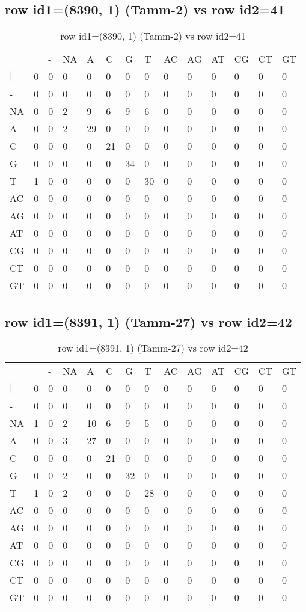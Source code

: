 \subsection{row id1=(8390, 1) (Tamm-2) vs row id2=41}
\begin{center}
\begin{longtable}{|l|l|l|l|l|l|l|l|l|l|l|l|l|l|}
\caption{row id1=(8390, 1) (Tamm-2) vs row id2=41} \label{table_dm642}\\
\hline
\\
\hline
&$|$&-&NA&A&C&G&T&AC&AG&AT&CG&CT&GT\\
$|$&0&0&0&0&0&0&0&0&0&0&0&0&0\\
-&0&0&0&0&0&0&0&0&0&0&0&0&0\\
NA&0&0&2&9&6&9&6&0&0&0&0&0&0\\
A&0&0&2&29&0&0&0&0&0&0&0&0&0\\
C&0&0&0&0&21&0&0&0&0&0&0&0&0\\
G&0&0&0&0&0&34&0&0&0&0&0&0&0\\
T&1&0&0&0&0&0&30&0&0&0&0&0&0\\
AC&0&0&0&0&0&0&0&0&0&0&0&0&0\\
AG&0&0&0&0&0&0&0&0&0&0&0&0&0\\
AT&0&0&0&0&0&0&0&0&0&0&0&0&0\\
CG&0&0&0&0&0&0&0&0&0&0&0&0&0\\
CT&0&0&0&0&0&0&0&0&0&0&0&0&0\\
GT&0&0&0&0&0&0&0&0&0&0&0&0&0\\
\hline
\end{longtable}
\end{center}

\subsection{row id1=(8391, 1) (Tamm-27) vs row id2=42}
\begin{center}
\begin{longtable}{|l|l|l|l|l|l|l|l|l|l|l|l|l|l|}
\caption{row id1=(8391, 1) (Tamm-27) vs row id2=42} \label{table_dm644}\\
\hline
\\
\hline
&$|$&-&NA&A&C&G&T&AC&AG&AT&CG&CT&GT\\
$|$&0&0&0&0&0&0&0&0&0&0&0&0&0\\
-&0&0&0&0&0&0&0&0&0&0&0&0&0\\
NA&1&0&2&10&6&9&5&0&0&0&0&0&0\\
A&0&0&3&27&0&0&0&0&0&0&0&0&0\\
C&0&0&0&0&21&0&0&0&0&0&0&0&0\\
G&0&0&2&0&0&32&0&0&0&0&0&0&0\\
T&1&0&2&0&0&0&28&0&0&0&0&0&0\\
AC&0&0&0&0&0&0&0&0&0&0&0&0&0\\
AG&0&0&0&0&0&0&0&0&0&0&0&0&0\\
AT&0&0&0&0&0&0&0&0&0&0&0&0&0\\
CG&0&0&0&0&0&0&0&0&0&0&0&0&0\\
CT&0&0&0&0&0&0&0&0&0&0&0&0&0\\
GT&0&0&0&0&0&0&0&0&0&0&0&0&0\\
\hline
\end{longtable}
\end{center}


